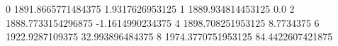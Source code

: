 0 1891.8665771484375 1.9317626953125
1 1889.934814453125 0.0
2 1888.7733154296875 -1.1614990234375
4 1898.708251953125 8.7734375
6 1922.9287109375 32.993896484375
8 1974.3770751953125 84.4422607421875
